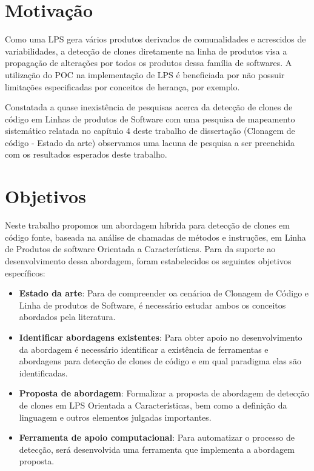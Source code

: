 \section{Motivação}
Como uma LPS gera vários produtos derivados de comunalidades e acrescidos de variabilidades, a detecção de clones diretamente na linha de produtos visa a propagação de alterações por todos os produtos dessa família de softwares. A utilização do POC na implementação de LPS é beneficiada por não possuir limitações especificadas por conceitos de herança, por exemplo.

Constatada a quase inexistência de pesquisas acerca da detecção de clones de código em Linhas de produtos de Software com uma pesquisa de mapeamento sistemático relatada no capítulo 4 deste trabalho de dissertação (Clonagem de código - Estado da arte) observamos uma lacuna de pesquisa a ser preenchida com os resultados esperados deste trabalho.

\section{Objetivos}

Neste trabalho propomos um abordagem híbrida para detecção de clones em código fonte, baseada na análise de chamadas de métodos e instruções, em Linha de Produtos de software Orientada a Características. Para da suporte ao desenvolvimento dessa abordagem, foram estabelecidos os seguintes objetivos específicos:

\begin{itemize}
	\item \textbf{Estado da arte}: Para de compreender oa cenárioa de Clonagem de Código e Linha de produtos de Software, é necessário estudar ambos os conceitos abordados pela literatura.
	
	\item \textbf{Identificar abordagens existentes}: Para obter apoio no desenvolvimento da abordagem é necessário identificar a existência de ferramentas e abordagens para detecção de clones de código e em qual paradigma elas são identificadas.   
	
	\item \textbf{Proposta de abordagem}: Formalizar a proposta de abordagem de detecção de clones em LPS Orientada a Características, bem como a definição da linguagem e outros elementos julgadas importantes.
	
	\item \textbf{Ferramenta de apoio computacional}: Para automatizar o processo de detecção, será desenvolvida uma ferramenta que implementa a abordagem proposta.
	
\end{itemize}
 




